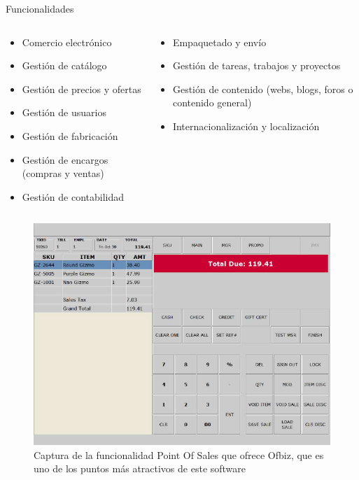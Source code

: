 
\begin{frame}{Funcionalidades}
\begin{columns}[T]
	\begin{column}{.5\textwidth}
	\begin{itemize}
		\item Comercio electrónico
		\item Gestión de catálogo
		\item Gestión de precios y ofertas
		\item Gestión de usuarios
		\item Gestión de fabricación
		\item Gestión de encargos (compras y ventas)
		\item Gestión de contabilidad
		
	\end{itemize}
\end{column}
	\begin{column}{.5\textwidth}
	\begin{itemize}
		\justifying
		\item Empaquetado y envío
		\item Gestión de tareas, trabajos y proyectos
		\item Gestión de contenido (webs, blogs, foros o contenido general)
		\item Internacionalización y localización
	\end{itemize}
\end{column}
\end{columns}

\end{frame}

\begin{frame}
\begin{figure}[H]
	\centering
	\includegraphics[width=0.9\linewidth]{img/posOfbiz.png}
	\caption{Captura de la funcionalidad Point Of Sales que ofrece Ofbiz, que es uno de los puntos más atractivos de este software}
\end{figure}

\end{frame}

